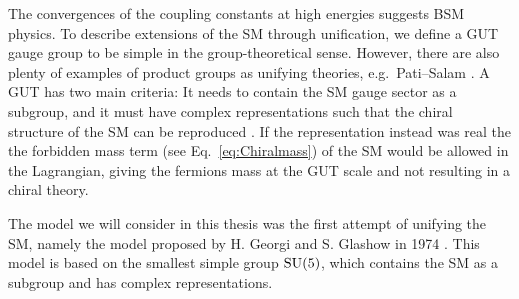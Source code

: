 The convergences of the coupling constants at high energies suggests BSM physics. To describe extensions of the SM through unification, we define a GUT gauge group to be simple in the group-theoretical sense. However, there are also plenty of examples of product groups as unifying theories, e.g.\ Pati--Salam \cite{Pati:1974yy}. A GUT has two main criteria: It needs to contain the SM gauge sector as a subgroup, and it must have complex representations such that the chiral structure of the SM can be reproduced \cite{Croon:2019kpe}. If the representation instead was real the the forbidden mass term (see Eq.~\eqref{eq:Chiralmass}) of the SM would be allowed in the Lagrangian, giving the fermions mass at the GUT scale and not resulting in a chiral theory.   

The model we will consider in this thesis was the first attempt of unifying the SM, namely the model proposed by H. Georgi and S. Glashow in 1974 \cite{Georgi:1974yf}. This model is based on the smallest simple group $\mathrm{SU}(5)$, which contains the SM as a subgroup and has complex representations. 

